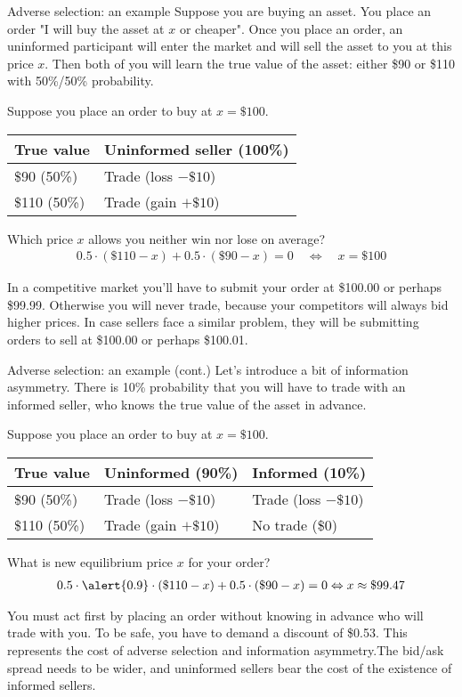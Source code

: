 \documentclass{beamer}
\begin{document}
\begin{frame}{Adverse selection: an example}
\justify
Suppose you are buying an asset. You place an order "I will buy the asset at $x$ or cheaper". Once you place an order, an uninformed participant will enter the market and will sell the asset to you at this price $x$. Then both of you will learn the true value of the asset: either \$90 or \$110 with 50\%/50\% probability.

\justify
Suppose you place an order to buy at $x=\$100$.

\centering
\begin{tabular}{l|l}
True value & Uninformed seller (100\%)  \\ \hline
\$90 (50\%) & Trade (loss $-\$10$) \\ \hline
\$110 (50\%) & Trade (gain $+\$10$) 
\end{tabular}

\justify
Which price $x$ allows you neither win nor lose on average?
\begin{align*}
0.5\cdot(\$110 - x) + 0.5\cdot(\$90 - x) = 0 \quad \Leftrightarrow \quad x = \$100
\end{align*}

\justify
In a competitive market you'll have to submit your order at \$100.00 or perhaps \$99.99. Otherwise you will never trade, because your competitors will always bid higher prices. In case sellers face a similar problem, they will be submitting orders to sell at \$100.00 or perhaps \$100.01.
\end{frame}



\begin{frame}{Adverse selection: an example (cont.)}
\justify
Let's introduce a bit of information asymmetry. There is 10\% probability that you will have to trade with an \alert{informed} seller, who knows the true value of the asset in advance.

\justify
Suppose you place an order to buy at $x=\$100$.

\centering
\begin{tabular}{l|l|l}
True value & Uninformed (90\%) & Informed (10\%) \\ \hline
\$90 (50\%) & Trade (loss $-\$10$) & Trade (loss $-\$10$) \\ \hline
\$110 (50\%) & Trade (gain $+\$10$) & No trade (\$0) 
\end{tabular}

\justify
What is new equilibrium price $x$ for your order?
\begin{align*}
0.5\cdot\alert{0.9}\cdot(\$110 - x) + 0.5 \cdot (\$90 - x) = 0 \Leftrightarrow x \approx \$99.47
\end{align*}

\justify
You must act first by placing an order without knowing in advance who will trade with you. To be safe, you have to demand a discount of \$0.53. This represents the cost of adverse selection and information asymmetry.The bid/ask spread needs to be wider, and uninformed sellers bear the cost of the existence of informed sellers.
\end{frame}
\end{document}
